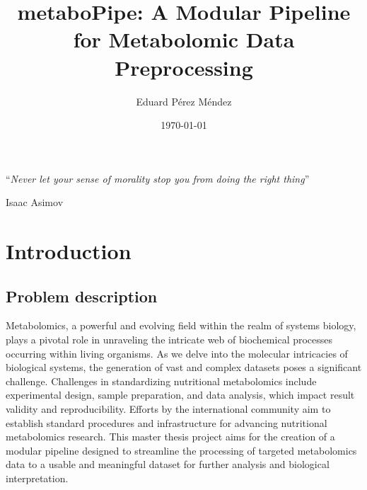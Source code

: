 \documentclass[ENG, BIB]{TFUOC}%
\title{metaboPipe: A Modular Pipeline for Metabolomic Data Preprocessing}
\author{Eduard Pérez Méndez}
\date{\today}
\begin{document}
            
            \estructura
            
            \newpage\null\thispagestyle{empty}
            
            \vspace*{0.4\textheight} 
            
            \noindent\enquote{\itshape Never let your sense of morality stop you from doing the right thing}\bigbreak 
            
            
            

            \hfill Isaac Asimov
            
            \newpage
            
            
            \tableofcontents
            
\listoffigures

\listoftables



\chapter{Introduction}

\section{Problem description}

Metabolomics, a powerful and evolving field within the realm of systems biology, plays a pivotal role in unraveling the intricate web of biochemical processes occurring within living organisms. As we delve into the molecular intricacies of biological systems, the generation of vast and complex datasets poses a significant challenge. Challenges in standardizing nutritional metabolomics include experimental design, sample preparation, and data analysis, which impact result validity and reproducibility. Efforts by the international community aim to establish standard procedures and infrastructure for advancing nutritional metabolomics research. This master thesis project aims for the creation of a modular pipeline designed to streamline the processing of targeted metabolomics data to a usable and meaningful dataset for further analysis and biological interpretation.
\end{document}
